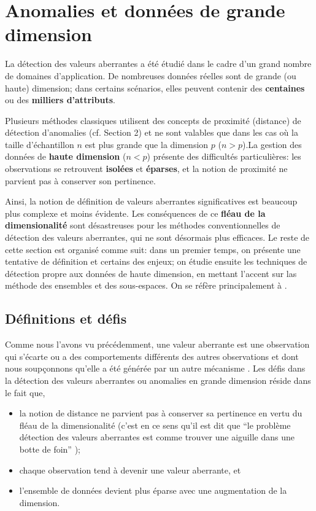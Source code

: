 \newpage

\section{Anomalies et données de grande dimension}\label{Section:4}
%
La détection des valeurs aberrantes a été étudié dans le cadre d’un grand nombre de domaines d’application. De nombreuses données réelles sont de  grande (ou haute) dimension; dans certains scénarios, elles peuvent contenir des \textbf{centaines} ou des \textbf{milliers d'attributs}. \par Plusieurs méthodes classiques utilisent des concepts de proximité (distance) de détection d’anomalies (cf. Section 2) et ne sont valables que dans les cas où la taille d’échantillon $n$ est plus grande que la dimension $p$ ($n>p$).\newl La gestion des données de \textbf{haute dimension} ($n<p$) pr\'esente des difficult\'es particuli\`eres: les observations se retrouvent  \textbf{isolées} et \textbf{éparses}, et la notion de proximité ne parvient pas à conserver son pertinence. \par Ainsi, la notion de définition de valeurs aberrantes significatives est beaucoup plus complexe et moins évidente. Les cons\'equences de ce \textbf{fléau de la dimensionalité} sont d\'esastreuses pour les  méthodes conventionnelles de  détection des valeurs aberrantes, qui ne sont d\'esormais plus efficaces. \newl
Le reste de cette section est organisé comme suit: dans un premier temps, on pr\'esente une tentative de définition et certains des enjeux; on étudie ensuite les techniques de détection propre aux donn\'ees de haute dimension, en mettant l'accent sur las méthode des ensembles et des sous-espaces. On se réf\`ere principalement à \cite{A1,A8,A10,A14,Aurore}.

%
%
\subsection{D\'efinitions et défis}
%
%
Comme nous l'avons vu précédemment, une valeur aberrante est une observation qui s'écarte ou a des comportements différents des autres observations et dont nous  soup\-çon\-nons qu'elle a été générée par un autre mécanisme \cite{A1}. \newl
Les défis dans la détection des valeurs aberrantes ou anomalies en grande dimension réside dans le fait que,
\begin{itemize}[noitemsep]
\item la notion de distance ne parvient pas à conserver sa pertinence en vertu du fléau de la dimensionalité (c'est en ce sens qu'il est dit que ``le problème détection des valeurs aberrantes est comme trouver une aiguille dans une botte de foin'' \cite{A14});
\item chaque observation tend à devenir une valeur aberrante, et 
\item l'ensemble de données devient plus éparse avec une augmentation de la dimension.
\end{itemize}

